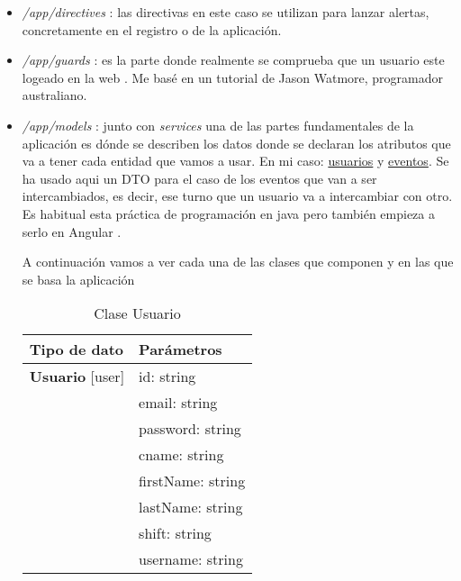 \begin{itemize}

	\item \emph{/app/directives} : las directivas  en este caso se utilizan para lanzar alertas, concretamente en el registro o  de la aplicación. 
	
	\item \emph{/app/guards} : es la parte donde realmente se comprueba que un usuario este logeado en la web \cite{guards}. Me basé en un tutorial \cite{logintut} de Jason Watmore, programador australiano. 
	
	\item \emph{/app/models} : junto con \emph{services} una de las partes fundamentales de la aplicación es dónde se describen los datos donde se declaran los atributos que va a tener cada entidad que vamos a usar. En mi caso: \underline{usuarios} y \underline{eventos}.  
	Se ha usado aqui un DTO \cite{dto} para el caso de los eventos que van a ser intercambiados, es decir, ese turno que un usuario va a intercambiar con otro. Es habitual esta práctica de programación en java pero también empieza a serlo en Angular \cite{dto2}.
	
	A continuación vamos a ver cada una de las clases que componen y en las que se basa la aplicación
	
\begin{table}[H]
\centering
\begin{tabular}{|l|l|}
\hline
Tipo de dato & Parámetros  \\
\hline \hline
\textbf{Usuario} [user] & id: string \\ 
    & email: string \\
    & password: string \\
    & cname: string \\
    & firstName: string \\
    & lastName: string \\
    & shift: string \\
    & username: string \\ \hline
\end{tabular}
\caption{Clase Usuario}
\end{table}




\end{itemize}
